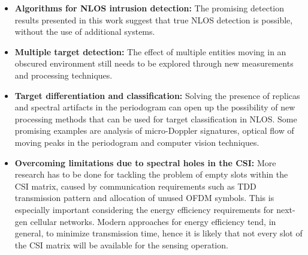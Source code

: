\begin{itemize}
	\item \textbf{Algorithms for NLOS intrusion detection:} \alert{The promising detection results presented in this work suggest that true NLOS detection is possible, without the use of additional systems.}
	\item \textbf{Multiple target detection:} The effect of multiple entities moving in an obscured environment still needs to be explored through new measurements and processing techniques.
	\item \textbf{Target differentiation and classification:} Solving the presence of replicas and spectral artifacts in the periodogram can open up the possibility of new processing methods that can be used for target classification in NLOS. Some promising examples are analysis of micro-Doppler signatures, optical flow of moving peaks in the periodogram and computer vision techniques.
	\item \textbf{Overcoming limitations due to spectral holes in the CSI:} \alert{More research has to be done for tackling the problem of empty slots within the CSI matrix, caused by communication requirements such as TDD transmission pattern and allocation of unused OFDM symbols. This is especially important considering the energy efficiency requirements for next-gen cellular networks.
	Modern approaches for energy efficiency tend, in general, to minimize transmission time, hence it is likely that not every slot of the CSI matrix will be available for the sensing operation.}
\end{itemize}
